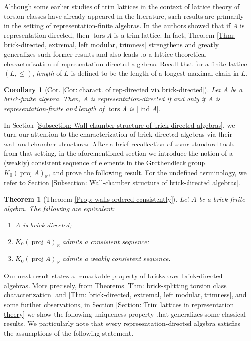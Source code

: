 \documentclass{amsart}
\theoremstyle{thmstyle}
\newtheorem{theorem}[thm]{Theorem}
\newtheorem{corollary}[thm]{Corollary}
\theoremstyle{exstyle}
\theoremstyle{defstyle}
\theoremstyle{remstyle}
\theoremstyle{remstyle}
\DeclareMathOperator*{\proj}{proj}
\DeclareMathOperator*{\ind}{ind}
\DeclareMathOperator*{\tors}{tors}
\begin{document}
Although some earlier studies of trim lattices in the context of lattice theory of torsion classes have already appeared in the literature, such results are primarily in the setting of representation-finite algebras. In \cite[Corollary 1.5]{TW} the authors showed that if $A$ is representation-directed, then $\tors A$ is a trim lattice. In fact, Theorem \ref{Thm: brick-directed, extremal, left modular, trimness} strengthens and greatly generalizes such former results and also leads to a lattice theoretical characterization of representation-directed algebras. 
Recall that for a finite lattice $(L,\leq)$, \emph{length} of $L$ is defined to be the length of a longest maximal chain in $L$.

\begin{corollary}[Cor. \ref{Cor: charact. of rep-directed via brick-directed}]\label{Cor: Characterization of rep-directed algebras}
Let $A$ be a brick-finite algebra. Then, $A$ is representation-directed if and only if $A$ is representation-finite and length of $\tors A$ is $|{\ind A}|$.
\end{corollary}

In Section \ref{Subsection: Wall-chamber structure of brick-directed algebras}, we turn our attention to the characterization of brick-directed algebras via their wall-and-chamber structures. After a brief recollection of some standard tools from that setting, in the aforementioned section we introduce the notion of a (weakly) consistent sequence of elements in the Grothendieck group $K_0(\proj A)_{\mathbb{R}}$, and prove the following result. For the undefined terminology, we refer to Section \ref{Subsection: Wall-chamber structure of brick-directed algebras}.

 \begin{theorem}[Theorem \ref{Prop: walls ordered consistently}]\label{Thm: wall-chamber}
     Let $A$ be a brick-finite algebra. The following are equivalent:
\begin{enumerate}
    \item $A$ is brick-directed;
    \item $K_0(\proj A)_{\mathbb{R}}$ admits a consistent sequence;
    \item $K_0(\proj A)_{\mathbb{R}}$ admits a weakly consistent sequence.
\end{enumerate}
 \end{theorem}

Our next result states a remarkable property of bricks over brick-directed algebras. More precisely, from Theorems \ref{Thm: brick-splitting torsion class characterization} and \ref{Thm: brick-directed, extremal, left modular, trimness}, and some further observations, in Section \ref{Section: Trim lattices in representation theory} we show the following uniqueness property that generalizes some classical results. We particularly note that every representation-directed algebra satisfies the assumptions of the following statement.
\end{document}
